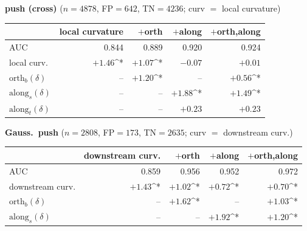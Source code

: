 \begin{table}[t]
\medskip
\textbf{push (cross)} ($n=4878$, FP$=642$, TN$=4236$; curv $=$ local curvature)

\begin{tabular}{l r r r r }
\toprule
 & local curvature & $+$orth & $+$along & $+$orth,along \\
\midrule
AUC & 0.844 & 0.889 & 0.920 & 0.924 \\
local curv. & $+1.46$^* & $+1.07$^* & $-0.07$ & $+0.01$ \\
$\mathrm{orth}_b(\delta)$ & -- & $+1.20$^* & -- & $+0.56$^* \\
$\mathrm{along}_s(\delta)$ & -- & -- & $+1.88$^* & $+1.49$^* \\
$\mathrm{along}_t(\delta)$ & -- & -- & $+0.23$ & $+0.23$ \\
\bottomrule
\end{tabular}

\medskip
\textbf{Gauss.\ push} ($n=2808$, FP$=173$, TN$=2635$; curv $=$ downstream curv.)

\begin{tabular}{l r r r r }
\toprule
 & downstream curv. & $+$orth & $+$along & $+$orth,along \\
\midrule
AUC & 0.859 & 0.956 & 0.952 & 0.972 \\
downstream curv. & $+1.43$^* & $+1.02$^* & $+0.72$^* & $+0.70$^* \\
$\mathrm{orth}_b(\delta)$ & -- & $+1.62$^* & -- & $+1.03$^* \\
$\mathrm{along}_s(\delta)$ & -- & -- & $+1.92$^* & $+1.20$^* \\
\bottomrule
\end{tabular}

\end{table}
